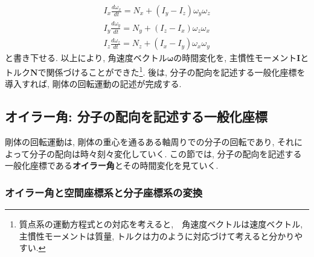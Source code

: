 \begin{align}
  I_{x} \frac{d \omega_{x}}{dt}
  =
  N_{x} + (I_{y} - I_{z}) \omega_{y} \omega_{z}
  \label{Eq:EulaerEq_x}
  \\
  I_{y} \frac{d \omega_{y}}{dt}
  =
  N_{y} + (I_{z} - I_{x}) \omega_{z} \omega_{x}
  \label{Eq:EulaerEq_y}
  \\
  I_{z} \frac{d \omega_{z}}{dt}
  =
  N_{z} + (I_{x} - I_{y}) \omega_{x} \omega_{y}
  \label{Eq:EulaerEq_z}
\end{align}
と書き下せる.
以上により, 角速度ベクトル$\bm{\omega}$の時間変化を, 主慣性モーメント$\bm{I}$とトルク$\bm{N}$で関係づけることができた\footnote{質点系の運動方程式との対応を考えると,　角速度ベクトルは速度ベクトル, 主慣性モーメントは質量, トルクは力のように対応づけて考えると分かりやすい.}.
後は, 分子の配向を記述する一般化座標を導入すれば, 剛体の回転運動の記述が完成する.

\subsection{オイラー角: 分子の配向を記述する一般化座標}

剛体の回転運動は, 剛体の重心を通るある軸周りでの分子の回転であり, それによって分子の配向は時々刻々変化していく.
この節では, 分子の配向を記述する一般化座標である\textbf{オイラー角}とその時間変化を見ていく.


\subsubsection{オイラー角と空間座標系と分子座標系の変換}

